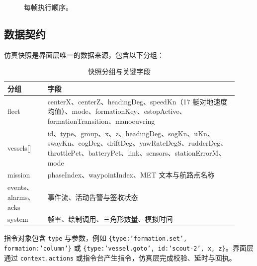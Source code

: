\documentclass[UTF8, a4paper, 11pt]{ctexart}
\newcommand{\file}[1]{\texttt{#1}}
\begin{document}
\begin{figure}[H]
\centering
{}
\caption{每帧执行顺序。}
\label{fig:loop}
\end{figure}

\subsection{数据契约}

仿真快照是界面层唯一的数据来源，包含以下分组：

\begin{table}[H]
\centering
\caption{快照分组与关键字段}
\label{tab:snapshot}
\small
\begin{tabular}{@{}p{0.16\linewidth}p{0.76\linewidth}@{}}
\toprule
\textbf{分组} & \textbf{字段} \\
\midrule
fleet & centerX、centerZ、headingDeg、speedKn（17 艇对地速度均值）、mode、formationKey、estopActive、formationTransition、manoeuvring \\
vessels[] & id、type、group、x、z、headingDeg、sogKn、uKn、swayKn、cogDeg、driftDeg、yawRateDegS、rudderDeg、throttlePct、batteryPct、link、sensors、stationErrorM、mode \\
mission & phaseIndex、waypointIndex、MET 文本与航路点名称 \\
events、alarms、acks & 事件流、活动告警与签收状态 \\
system & 帧率、绘制调用、三角形数量、模拟时间 \\
\bottomrule
\end{tabular}
\end{table}

指令对象包含 \texttt{type} 与参数，例如 \texttt{\{type:'formation.set', formation:'column'\}} 或 \texttt{\{type:'vessel.goto', id:'scout-2', x, z\}}。界面层通过 \file{context.actions} 或指令台产生指令，仿真层完成校验、延时与回执。
\end{document}
